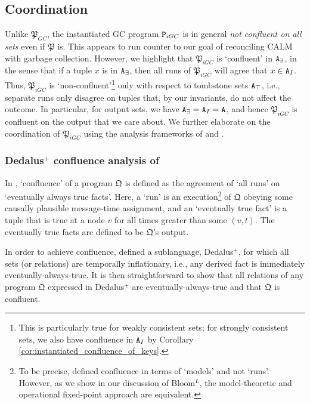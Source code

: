 \subsection{Coordination}
Unlike $\mathfrak{P}_{GC}$, the instantiated GC program $\tt{P}_{iGC}$ is in general \emph{not confluent on all sets} even if $\mathfrak{P}$ is.
This appears to run counter to our goal of reconciling CALM with garbage collection.
However, we highlight that $\mathfrak{P}_{iGC}$ is `confluent' in $\tt{A}_\exists$, in the sense that if a tuple $x$ is in $\tt{A}_\exists$, then all runs of $\mathfrak{P}_{iGC}$ will agree that $x \in \tt{A}_I$.
Thus, $\mathfrak{P}_{iGC}$ is `non-confluent'\footnote{
	This is particularly true for weakly consistent sets; for strongly consistent sets, we also have confluence in $\tt{A}_I$ by Corollary \ref{cor:instantiated_confluence_of_keys}.
}
only with respect to tombstone sets $\tt{A}_\top$, i.e., separate runs only disagree on tuples that, by our invariants, do not affect the outcome.
In particular, for output sets, we have $\tt{A}_\exists = \tt{A}_I = \tt{A}$, and hence $\mathfrak{P}_{iGC}$ is confluent on the output that we care about.
We further elaborate on the coordination of $\mathfrak{P}_{iGC}$ using the analysis frameworks of \cite{marczak2012confluence} and \cite{ameloot2013relational}.


\subsubsection{Dedalus$^+$ confluence analysis of \cite{marczak2012confluence}}
In \cite{marczak2012confluence}, `confluence' of a program $\mathfrak{Q}$ is defined as the agreement of `all runs' on `eventually always true facts'.
Here, a `run' is an execution\footnote{
	To be precise, \cite{marczak2012confluence} defined confluence in terms of `models' and not `runs'.
    However, as we show in our discussion of Bloom$^L$, the model-theoretic and operational fixed-point approach are equivalent.
} of $\mathfrak{Q}$ obeying some causally plausible message-time assignment, and an `eventually true fact' is a tuple that is true at a node $v$ for all times greater than some $(v,t)$.
The eventually true facts are defined to be $\mathfrak{Q}$'s output.

In order to achieve confluence, \cite{marczak2012confluence} defined a sublanguage, Dedalus$^+$, for which all sets (or relations) are temporally inflationary, i.e., any derived fact is immediately eventually-always-true.
It is then straightforward to show that all relations of any program $\mathfrak{Q}$ expressed in Dedalus$^+$ are eventually-always-true and that $\mathfrak{Q}$ is confluent.

